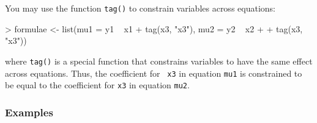 You may use the function {\tt tag()} to constrain variables across
equations:
\begin{Schunk}
\begin{Sinput}
> formulae <- list(mu1 = y1 ~ x1 + tag(x3, "x3"), mu2 = y2 ~ x2 + 
+     tag(x3, "x3"))
\end{Sinput}
\end{Schunk}
where {\tt tag()} is a special function that constrains variables to
have the same effect across equations.  Thus, the coefficient for {\tt
x3} in equation {\tt mu1} is constrained to be equal to the
coefficient for {\tt x3} in equation {\tt mu2}.  

\subsubsection{Examples}

